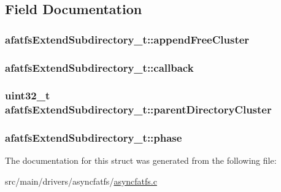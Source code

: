 \subsection{Field Documentation}
\hypertarget{structafatfsExtendSubdirectory__t_a341f3eac0ad09d79447faf699861ff02}{
\subsubsection[{append\+Free\+Cluster}]{ afatfs\+Extend\+Subdirectory\+\_\+t\+::append\+Free\+Cluster}}\label{structafatfsExtendSubdirectory__t_a341f3eac0ad09d79447faf699861ff02}
\hypertarget{structafatfsExtendSubdirectory__t_a3d82ed2665c3aa6c4aeac9cf4ae21e87}{
\subsubsection[{callback}]{ afatfs\+Extend\+Subdirectory\+\_\+t\+::callback}}\label{structafatfsExtendSubdirectory__t_a3d82ed2665c3aa6c4aeac9cf4ae21e87}
\hypertarget{structafatfsExtendSubdirectory__t_ad7cf8ed318a8eedd591b0d49afe2a6a5}{
\subsubsection[{parent\+Directory\+Cluster}]{\setlength{\rightskip}{0pt plus 5cm}uint32\+\_\+t afatfs\+Extend\+Subdirectory\+\_\+t\+::parent\+Directory\+Cluster}}\label{structafatfsExtendSubdirectory__t_ad7cf8ed318a8eedd591b0d49afe2a6a5}
\hypertarget{structafatfsExtendSubdirectory__t_a8671ce558b40b5efc2ebb345a95d08d9}{
\subsubsection[{phase}]{ afatfs\+Extend\+Subdirectory\+\_\+t\+::phase}}\label{structafatfsExtendSubdirectory__t_a8671ce558b40b5efc2ebb345a95d08d9}


The documentation for this struct was generated from the following file\+:\begin{DoxyCompactItemize}
\item 
src/main/drivers/asyncfatfs/\hyperlink{asyncfatfs_8c}{asyncfatfs.\+c}\end{DoxyCompactItemize}
